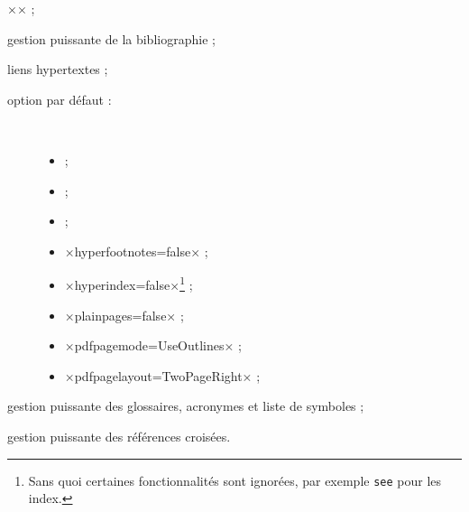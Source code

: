 \begin{description}
\begin{description}
      ×\SetCiteCommand{\autocite}× ;
  \end{description}
\item[\package*{biblatex} :] gestion puissante de la bibliographie ;
\item[\package*{hyperref} :] %
  liens hypertextes ;
  \begin{description}
  \item[option par défaut :]\
    \begin{itemize}
    \item {} ;
    \item {} ;
    \item {} ;
    \item ×hyperfootnotes=false× ;
    \item ×hyperindex=false×\footnote{Sans quoi certaines fonctionnalités sont
        ignorées, par exemple \protect\lstinline|see| pour les index.} ;
    \item ×plainpages=false× ;
    \item ×pdfpagemode=UseOutlines× ;
    \item ×pdfpagelayout=TwoPageRight× ;
    \end{itemize}
  \end{description}
\item[\package*{glossaries} :] gestion puissante des glossaires,
  acronymes et liste de symboles ;
\item[\package*{cleveref} :] gestion puissante des références croisées.
\end{description}

%
\iffalse
\fi
